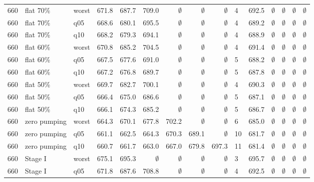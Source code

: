 \documentclass[11pt,a4paper]{article}
\begin{document}
\begin{longtable}{lllrrrrrrlrrrrr}
660 & flat 70\% & worst & 671.8 & 687.7 & 709.0 & $\emptyset$ & $\emptyset$ & $\emptyset$ & 4 & 692.5 & $\emptyset$ & $\emptyset$ & $\emptyset$ & $\emptyset$ \\
660 & flat 70\% & q05 & 668.6 & 680.1 & 695.5 & $\emptyset$ & $\emptyset$ & $\emptyset$ & 4 & 689.2 & $\emptyset$ & $\emptyset$ & $\emptyset$ & $\emptyset$ \\
660 & flat 70\% & q10 & 668.2 & 679.3 & 694.1 & $\emptyset$ & $\emptyset$ & $\emptyset$ & 4 & 688.9 & $\emptyset$ & $\emptyset$ & $\emptyset$ & $\emptyset$ \\
660 & flat 60\% & worst & 670.8 & 685.2 & 704.5 & $\emptyset$ & $\emptyset$ & $\emptyset$ & 4 & 691.4 & $\emptyset$ & $\emptyset$ & $\emptyset$ & $\emptyset$ \\
660 & flat 60\% & q05 & 667.5 & 677.6 & 691.0 & $\emptyset$ & $\emptyset$ & $\emptyset$ & 5 & 688.2 & $\emptyset$ & $\emptyset$ & $\emptyset$ & $\emptyset$ \\
660 & flat 60\% & q10 & 667.2 & 676.8 & 689.7 & $\emptyset$ & $\emptyset$ & $\emptyset$ & 5 & 687.8 & $\emptyset$ & $\emptyset$ & $\emptyset$ & $\emptyset$ \\
660 & flat 50\% & worst & 669.7 & 682.7 & 700.1 & $\emptyset$ & $\emptyset$ & $\emptyset$ & 4 & 690.3 & $\emptyset$ & $\emptyset$ & $\emptyset$ & $\emptyset$ \\
660 & flat 50\% & q05 & 666.4 & 675.0 & 686.6 & $\emptyset$ & $\emptyset$ & $\emptyset$ & 5 & 687.1 & $\emptyset$ & $\emptyset$ & $\emptyset$ & $\emptyset$ \\
660 & flat 50\% & q10 & 666.1 & 674.3 & 685.2 & $\emptyset$ & $\emptyset$ & $\emptyset$ & 5 & 686.7 & $\emptyset$ & $\emptyset$ & $\emptyset$ & $\emptyset$ \\
660 & zero pumping & worst & 664.3 & 670.1 & 677.8 & 702.2 & $\emptyset$ & $\emptyset$ & 6 & 685.0 & $\emptyset$ & $\emptyset$ & $\emptyset$ & $\emptyset$ \\
660 & zero pumping & q05 & 661.1 & 662.5 & 664.3 & 670.3 & 689.1 & $\emptyset$ & 10 & 681.7 & $\emptyset$ & $\emptyset$ & $\emptyset$ & $\emptyset$ \\
660 & zero pumping & q10 & 660.7 & 661.7 & 663.0 & 667.0 & 679.8 & 697.3 & 11 & 681.4 & $\emptyset$ & $\emptyset$ & $\emptyset$ & $\emptyset$ \\
660 & Stage I & worst & 675.1 & 695.3 & $\emptyset$ & $\emptyset$ & $\emptyset$ & $\emptyset$ & 3 & 695.7 & $\emptyset$ & $\emptyset$ & $\emptyset$ & $\emptyset$ \\
660 & Stage I & q05 & 671.8 & 687.6 & 708.8 & $\emptyset$ & $\emptyset$ & $\emptyset$ & 4 & 692.5 & $\emptyset$ & $\emptyset$ & $\emptyset$ & $\emptyset$ \\

\end{longtable}
\end{document}
